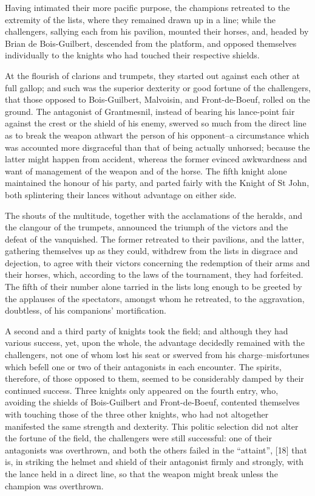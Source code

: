 Having intimated their more pacific purpose, the champions retreated to
the extremity of the lists, where they remained drawn up in a line;
while the challengers, sallying each from his pavilion, mounted their
horses, and, headed by Brian de Bois-Guilbert, descended from the
platform, and opposed themselves individually to the knights who had
touched their respective shields.

At the flourish of clarions and trumpets, they started out against each
other at full gallop; and such was the superior dexterity or good
fortune of the challengers, that those opposed to Bois-Guilbert,
Malvoisin, and Front-de-Boeuf, rolled on the ground. The antagonist of
Grantmesnil, instead of bearing his lance-point fair against the crest
or the shield of his enemy, swerved so much from the direct line as to
break the weapon athwart the person of his opponent--a circumstance
which was accounted more disgraceful than that of being actually
unhorsed; because the latter might happen from accident, whereas the
former evinced awkwardness and want of management of the weapon and of
the horse. The fifth knight alone maintained the honour of his party,
and parted fairly with the Knight of St John, both splintering their
lances without advantage on either side.

The shouts of the multitude, together with the acclamations of the
heralds, and the clangour of the trumpets, announced the triumph of the
victors and the defeat of the vanquished. The former retreated to their
pavilions, and the latter, gathering themselves up as they could,
withdrew from the lists in disgrace and dejection, to agree with their
victors concerning the redemption of their arms and their horses, which,
according to the laws of the tournament, they had forfeited. The fifth
of their number alone tarried in the lists long enough to be greeted by
the applauses of the spectators, amongst whom he retreated, to the
aggravation, doubtless, of his companions' mortification.

A second and a third party of knights took the field; and although they
had various success, yet, upon the whole, the advantage decidedly
remained with the challengers, not one of whom lost his seat or swerved
from his charge--misfortunes which befell one or two of their
antagonists in each encounter. The spirits, therefore, of those opposed
to them, seemed to be considerably damped by their continued success.
Three knights only appeared on the fourth entry, who, avoiding the
shields of Bois-Guilbert and Front-de-Boeuf, contented themselves with
touching those of the three other knights, who had not altogether
manifested the same strength and dexterity. This politic selection did
not alter the fortune of the field, the challengers were still
successful: one of their antagonists was overthrown, and both the others
failed in the ``attaint'', {[}18{]} that is, in striking the helmet and
shield of their antagonist firmly and strongly, with the lance held in a
direct line, so that the weapon might break unless the champion was
overthrown.

